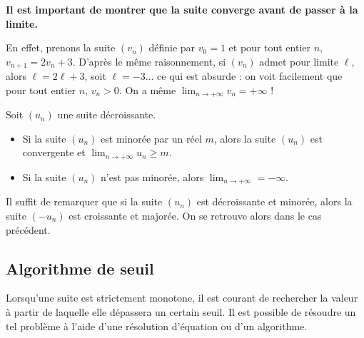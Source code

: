 \documentclass[11pt,fleqn, openany]{book} %
\begin{document}
\textbf{ Il est important de montrer que la suite converge avant de passer à la limite.} 
 
 En effet, prenons la suite $(v_n)$ définie par $v_0=1$ et pour tout entier $n$, $v_{n+1}=2v_n+3$. D'après le même raisonnement, si $(v_n)$ admet pour limite $\ell$, alors $\ell=2\ell+3$, soit $\ell=-3$... ce qui est absurde : on voit facilement que pour tout entier $n$, $v_n>0$. On a même $\displaystyle \lim_{n \to +\infty} v_n = +\infty$ !

\begin{theorem} Soit $(u_n)$ une suite décroissante.
\begin{itemize}
\item Si la suite $(u_n)$ est minorée par un réel $m$, alors la suite $(u_n)$ est convergente et $\displaystyle \lim_{n \to +\infty} u_n \geqslant m$.
\item Si la suite $(u_n)$ n'est pas minorée, alors $\displaystyle \lim_{n \to +\infty} = -\infty$.
\end{itemize} \end{theorem}
\begin{demonstration} Il suffit de remarquer que si la suite $(u_n)$ est décroissante et minorée, alors la suite $(-u_n)$ est croissante et majorée. On se retrouve alors dans le cas précédent.\end{demonstration}

\subsection{Algorithme de seuil}

Lorsqu'une suite est strictement monotone, il est courant de rechercher la valeur à partir de laquelle elle dépassera un certain seuil. Il est possible de résoudre un tel problème à l'aide d'une résolution d'équation ou d'un algorithme.
\end{document}
